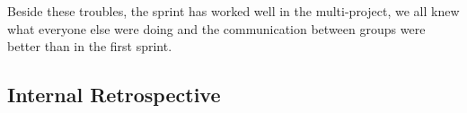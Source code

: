 Beside these troubles, the sprint has worked well in the multi-project, we all knew what everyone else were doing and the communication between groups were better than in the first sprint.

\subsection{Internal Retrospective}%
